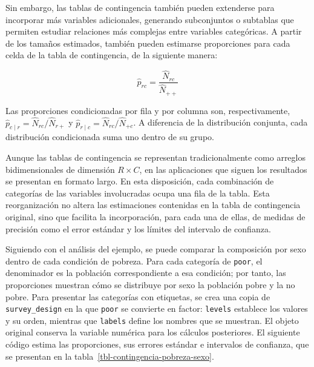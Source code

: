 \documentclass[
  spanish,
  11pt,
  letterpaper,
  oneside,
  open=any]{scrbook}
\begin{document}
Sin embargo, las tablas de contingencia también pueden extenderse para
incorporar más variables adicionales, generando subconjuntos o subtablas
que permiten estudiar relaciones más complejas entre variables
categóricas. A partir de los tamaños estimados, también pueden estimarse
proporciones para cada celda de la tabla de contingencia, de la
siguiente manera:

\[
\hat{p}_{rc}=\frac{\hat{N}_{rc}}{\hat{N}_{++}}
\]

Las proporciones condicionadas por fila y por columna son,
respectivamente, \(\hat p_{c\mid r}=\hat N_{rc}/\hat N_{r+}\) y
\(\hat p_{r\mid c}=\hat N_{rc}/\hat N_{+c}\). A diferencia de la
distribución conjunta, cada distribución condicionada suma uno dentro de
su grupo.

Aunque las tablas de contingencia se representan tradicionalmente como
arreglos bidimensionales de dimensión \(R \times C\), en las
aplicaciones que siguen los resultados se presentan en formato largo. En
esta disposición, cada combinación de categorías de las variables
involucradas ocupa una fila de la tabla. Esta reorganización no altera
las estimaciones contenidas en la tabla de contingencia original, sino
que facilita la incorporación, para cada una de ellas, de medidas de
precisión como el error estándar y los límites del intervalo de
confianza.

Siguiendo con el análisis del ejemplo, se puede comparar la composición
por sexo dentro de cada condición de pobreza. Para cada categoría de
\texttt{poor}, el denominador es la población correspondiente a esa
condición; por tanto, las proporciones muestran cómo se distribuye por
sexo la población pobre y la no pobre. Para presentar las categorías con
etiquetas, se crea una copia de \texttt{survey\_design} en la que
\texttt{poor} se convierte en factor: \texttt{levels} establece los
valores y su orden, mientras que \texttt{labels} define los nombres que
se muestran. El objeto original conserva la variable numérica para los
cálculos posteriores. El siguiente código estima las proporciones, sus
errores estándar e intervalos de confianza, que se presentan en la
tabla~\ref{tbl-contingencia-pobreza-sexo}.
\end{document}
